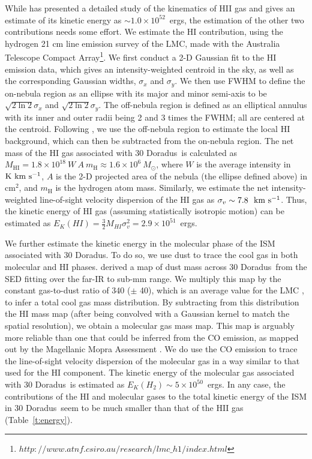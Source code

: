 \documentclass[usenatbib]{mnras}
\def\xs{30 Doradus}
\begin{document}
While \citet{Chu} has presented a detailed study of the kinematics of HII gas and gives an estimate of its kinetic energy as $\sim 1.0 \times 10^{52}$~ergs, the estimation of the other two contributions needs some effort. We estimate the HI contribution, using the hydrogen 21 cm line emission survey of the LMC, made with the Australia Telescope Compact Array\footnote{$http://www.atnf.csiro.au/research/lmc\_h1/index.html$}. 
We first conduct a 2-D Gaussian fit to the HI emission data, which gives an intensity-weighted centroid in the sky, as well as the corresponding Gaussian widths, $\sigma_x$ and $\sigma_y$. We then use FWHM to define the on-nebula region as an ellipse with its major and minor semi-axis to be $\sqrt{2 \ln{2}}\sigma_x$ and $\sqrt{2 \ln{2}}\sigma_y$. The off-nebula region is defined as an elliptical annulus with its inner and outer radii being 2 and 3 times the FWHM; all are centered at the centroid. Following \citet{Kim}, we use the off-nebula region to estimate the local HI background, which can then be subtracted from the on-nebula region. The net mass of the HI gas associated with \xs\ is calculated as $M_{\mathrm{HI}}=1.8 \times 10^{18}~W~A~m_{\mathrm{H}} \approx 1.6 \times 10^{6}~M_{\odot}$, where $W$ is the average intensity in ${\rm K~km~s^{-1}}$, $A$ is the 2-D projected area of the nebula (the ellipse defined above) in cm$^2$, and $m_{\mathrm{H}}$ is the hydrogen atom mass. Similarly, we estimate the net intensity-weighted line-of-sight velocity dispersion of the HI gas as $\sigma_v\sim7.8~{\rm~km~s^{-1}}$. Thus, the kinetic energy of HI gas (assuming statistically isotropic motion) can be estimated as $E_K(HI) = \frac{3}{2}M_{HI}\sigma_v^2 = 2.9 \times 10^{51}$~ergs. 

We further estimate the kinetic energy in the molecular phase of the ISM associated with \xs. To do so, we use dust to trace the cool gas in both molecular and HI phases. \citet{Gordon} derived a map of dust mass  across \xs\ from the SED fitting over the far-IR to sub-mm range. We multiply this map by the constant gas-to-dust ratio of 340 ($\pm$ 40), which is an average value for the LMC \citep{Skibba}, to infer a total cool gas mass distribution. By subtracting from this distribution the HI mass map (after being convolved with a Gaussian kernel to match the spatial resolution), 
we obtain a molecular gas mass map. This map is arguably more reliable than one that could be inferred from the CO emission, as mapped out by the Magellanic Mopra Assessment \citep{Fukui}. We do use the CO emission to trace the line-of-sight velocity dispersion of the molecular gas in a way similar to that used for the HI component. The kinetic energy of the molecular gas associated with \xs\ is estimated as $E_K(H_2) \sim 5 \times 10^{50}$~ergs. In any case, the contributions of the HI and molecular gases to the total kinetic energy of the ISM in \xs\ seem to be much smaller than that of the HII gas (Table~\ref{t:energy}). 
\end{document}
